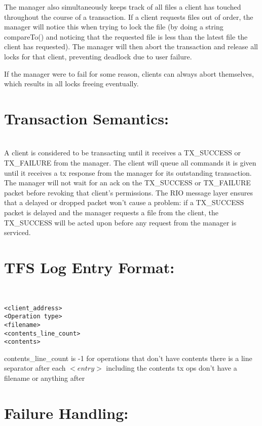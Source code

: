 \documentclass[11pt]{article}
\begin{document}
The manager also simultaneously keeps track of all files a client has touched throughout the course of a transaction. If a client requests files out of order, the manager will notice this when trying to lock the file (by doing a string compareTo() and noticing that the requested file is less than the latest file the client has requested). The manager will then abort the transaction and release all locks for that client, preventing deadlock due to user failure.

If the manager were to fail for some reason, clients can always abort themselves, which results in all locks freeing eventually.  \\

\section{Transaction Semantics:} \\

A client is considered to be transacting until it receives a TX\_SUCCESS or TX\_FAILURE from the manager. 
The client will queue all commands it is given until it receives a tx response from the manager for its outstanding transaction. \\
 
The manager will not wait for an ack on the TX\_SUCCESS or TX\_FAILURE packet before revoking that client's permissions. The RIO message layer ensures that a delayed or dropped packet won't cause a problem: if a TX\_SUCCESS packet is delayed and the manager requests a file from the client, the TX\_SUCCESS will be acted upon before any request from the manager is serviced. \\

\section{TFS Log Entry Format:} \\

\begin{verbatim}
<client_address>
<Operation type>
<filename>
<contents_line_count>
<contents>
\end{verbatim}

contents\_line\_count is -1 for operations that don't have contents
there is a line separator after each $<entry>$ including the contents
tx ops don't have a filename or anything after \\

\section{Failure Handling:} \\
\end{document}
